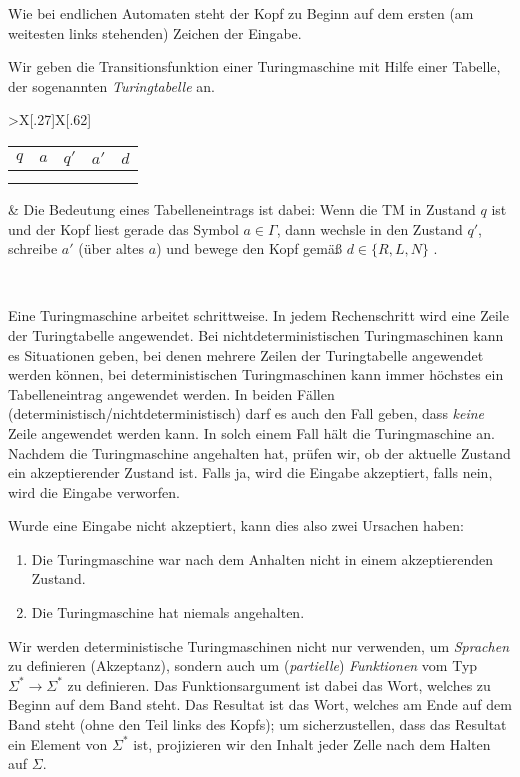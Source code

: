  Wie bei endlichen Automaten steht der Kopf zu Beginn auf dem ersten (am weitesten links stehenden) Zeichen der Eingabe.
 
 \smallskip
 
 Wir geben die Transitionsfunktion einer Turingmaschine mit Hilfe einer Tabelle, der sogenannten \emph{Turingtabelle} an.
 
 \begin{tabu}{>{\bfseries}X[.27]X[.62]}
	\begin{tabular}[t]{|*5{c|}}
		$q$ & $a$ & $q'$ & $a'$ & $d$ \\\hline
		&&&&\\
		&&&&
	\end{tabular}
	& 	Die Bedeutung eines Tabelleneintrags ist dabei: Wenn die \ac{TM} in Zustand $q$ ist und der Kopf liest
        gerade das Symbol $a\in\Gamma$, dann wechsle in den Zustand $q'$,
        schreibe $a'$ (über altes $a$) und bewege den Kopf gemäß
        $d\in\{R,L,N\}$ .
\end{tabu}\

Eine Turingmaschine arbeitet schrittweise.
In jedem Rechenschritt wird eine Zeile der Turingtabelle angewendet.
Bei nichtdeterministischen Turingmaschinen kann es Situationen geben, bei denen mehrere Zeilen der Turingtabelle angewendet werden können,
bei deterministischen Turingmaschinen kann immer höchstes ein Tabelleneintrag angewendet werden.
In beiden Fällen (deterministisch/nichtdeterministisch) darf es auch den Fall geben, dass \emph{keine} Zeile angewendet werden kann.
In solch einem Fall hält die Turingmaschine an.
Nachdem die Turingmaschine angehalten hat, prüfen wir, ob der aktuelle Zustand ein akzeptierender Zustand ist.
Falls ja, wird die Eingabe akzeptiert, falls nein, wird die Eingabe verworfen.

Wurde eine Eingabe nicht akzeptiert, kann dies also zwei Ursachen haben:
\begin{enumerate}
 \item Die Turingmaschine war nach dem Anhalten nicht in einem akzeptierenden Zustand.
 \item Die Turingmaschine hat niemals angehalten.
\end{enumerate}

Wir werden deterministische Turingmaschinen nicht nur verwenden, um \emph{Sprachen} zu definieren (Akzeptanz), sondern auch um (\emph{partielle}) \emph{Funktionen} vom Typ $\Sigma^*\rightarrow\Sigma^*$ zu definieren.
Das Funktionsargument ist dabei das Wort, welches zu Beginn auf dem Band steht.
Das Resultat ist das Wort, welches am Ende auf dem Band steht (ohne den Teil links des Kopfs);
um sicherzustellen, dass das Resultat ein Element von $\Sigma^*$ ist, projizieren wir den Inhalt jeder Zelle nach dem Halten auf $\Sigma$.


